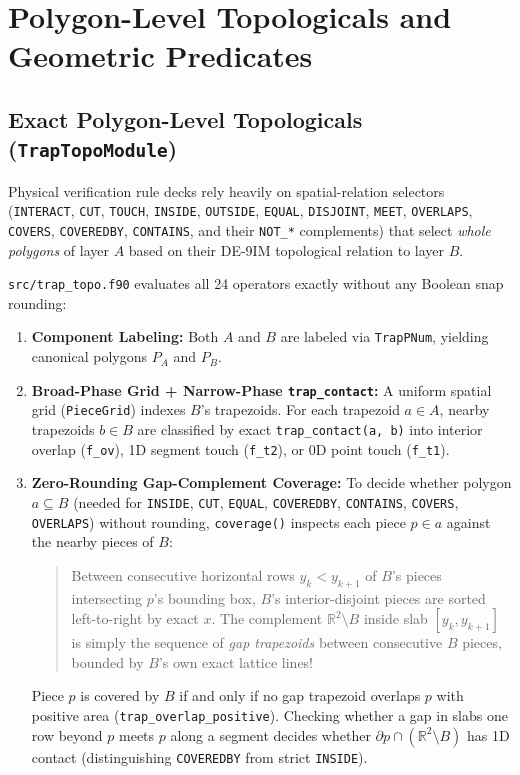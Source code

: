 \chapter{Polygon-Level Topologicals and Geometric Predicates}
\label{ch:topo_pred}

\section{Exact Polygon-Level Topologicals (\texttt{TrapTopoModule})}

Physical verification rule decks rely heavily on spatial-relation selectors (\texttt{INTERACT}, \texttt{CUT}, \texttt{TOUCH}, \texttt{INSIDE}, \texttt{OUTSIDE}, \texttt{EQUAL}, \texttt{DISJOINT}, \texttt{MEET}, \texttt{OVERLAPS}, \texttt{COVERS}, \texttt{COVEREDBY}, \texttt{CONTAINS}, and their \texttt{NOT\_*} complements) that select \emph{whole polygons} of layer $A$ based on their DE-9IM topological relation to layer $B$.

\texttt{src/trap\_topo.f90} evaluates all 24 operators exactly without any Boolean snap rounding:
\begin{enumerate}
  \item \textbf{Component Labeling:} Both $A$ and $B$ are labeled via \texttt{TrapPNum}, yielding canonical polygons $P_A$ and $P_B$.
  \item \textbf{Broad-Phase Grid + Narrow-Phase \texttt{trap\_contact}:} A uniform spatial grid (\texttt{PieceGrid}) indexes $B$'s trapezoids. For each trapezoid $a \in A$, nearby trapezoids $b \in B$ are classified by exact \texttt{trap\_contact(a, b)} into interior overlap (\texttt{f\_ov}), 1D segment touch (\texttt{f\_t2}), or 0D point touch (\texttt{f\_t1}).
  \item \textbf{Zero-Rounding Gap-Complement Coverage:} To decide whether polygon $a \subseteq B$ (needed for \texttt{INSIDE}, \texttt{CUT}, \texttt{EQUAL}, \texttt{COVEREDBY}, \texttt{CONTAINS}, \texttt{COVERS}, \texttt{OVERLAPS}) without rounding, \texttt{coverage()} inspects each piece $p \in a$ against the nearby pieces of $B$:
  \begin{quote}
    Between consecutive horizontal rows $y_k < y_{k+1}$ of $B$'s pieces intersecting $p$'s bounding box, $B$'s interior-disjoint pieces are sorted left-to-right by exact $x$. The complement $\mathbb{R}^2 \setminus B$ inside slab $[y_k, y_{k+1}]$ is simply the sequence of \emph{gap trapezoids} between consecutive $B$ pieces, bounded by $B$'s own exact lattice lines!
  \end{quote}
  Piece $p$ is covered by $B$ if and only if no gap trapezoid overlaps $p$ with positive area (\texttt{trap\_overlap\_positive}). Checking whether a gap in slabs one row beyond $p$ meets $p$ along a segment decides whether $\partial p \cap (\mathbb{R}^2 \setminus B)$ has 1D contact (distinguishing \texttt{COVEREDBY} from strict \texttt{INSIDE}).
\end{enumerate}

